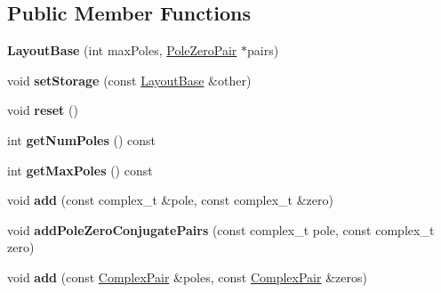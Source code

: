 \subsection*{Public Member Functions}
\begin{DoxyCompactItemize}
\item 
\hypertarget{classDsp_1_1LayoutBase_a6b80481de002e79d64b28d1a86d8a052}{{\bfseries Layout\-Base} (int max\-Poles, \hyperlink{structDsp_1_1PoleZeroPair}{Pole\-Zero\-Pair} $\ast$pairs)}\label{classDsp_1_1LayoutBase_a6b80481de002e79d64b28d1a86d8a052}

\item 
\hypertarget{classDsp_1_1LayoutBase_a9eb2cd2ab712542f0c55ab5e5f0b392f}{void {\bfseries set\-Storage} (const \hyperlink{classDsp_1_1LayoutBase}{Layout\-Base} \&other)}\label{classDsp_1_1LayoutBase_a9eb2cd2ab712542f0c55ab5e5f0b392f}

\item 
\hypertarget{classDsp_1_1LayoutBase_ad15053f48912a18c50429ffb75850059}{void {\bfseries reset} ()}\label{classDsp_1_1LayoutBase_ad15053f48912a18c50429ffb75850059}

\item 
\hypertarget{classDsp_1_1LayoutBase_abba5e6ea60e652998a9b54e50c3584db}{int {\bfseries get\-Num\-Poles} () const }\label{classDsp_1_1LayoutBase_abba5e6ea60e652998a9b54e50c3584db}

\item 
\hypertarget{classDsp_1_1LayoutBase_a82cdc954ed700b9c7b8ed62adcc740d5}{int {\bfseries get\-Max\-Poles} () const }\label{classDsp_1_1LayoutBase_a82cdc954ed700b9c7b8ed62adcc740d5}

\item 
\hypertarget{classDsp_1_1LayoutBase_aa2c7ad6702687c1507574aa54390c781}{void {\bfseries add} (const complex\-\_\-t \&pole, const complex\-\_\-t \&zero)}\label{classDsp_1_1LayoutBase_aa2c7ad6702687c1507574aa54390c781}

\item 
\hypertarget{classDsp_1_1LayoutBase_aa99f1abf1a58eb3398f3bd71c2b76215}{void {\bfseries add\-Pole\-Zero\-Conjugate\-Pairs} (const complex\-\_\-t pole, const complex\-\_\-t zero)}\label{classDsp_1_1LayoutBase_aa99f1abf1a58eb3398f3bd71c2b76215}

\item 
\hypertarget{classDsp_1_1LayoutBase_a0065f49a11180f19534076a57c017d67}{void {\bfseries add} (const \hyperlink{structDsp_1_1ComplexPair}{Complex\-Pair} \&poles, const \hyperlink{structDsp_1_1ComplexPair}{Complex\-Pair} \&zeros)}\label{classDsp_1_1LayoutBase_a0065f49a11180f19534076a57c017d67}


\end{DoxyCompactItemize}
